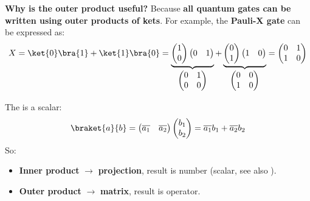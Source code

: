 \highspace
\textcolor{Green3}{ \textbf{Why is the outer product useful?}} Because \textbf{all quantum gates can be written using outer products of kets}. For example, the \textbf{Pauli-X gate} can be expressed as:
\begin{equation*}
    X = \ket{0}\bra{1} + \ket{1}\bra{0} =
    \underbrace{\begin{pmatrix}
        1 \\ 0
    \end{pmatrix}
    \begin{pmatrix}
        0 & 1
    \end{pmatrix}}_{\begin{pmatrix}
        0 & 1 \\
        0 & 0
    \end{pmatrix}}
    +
    \underbrace{\begin{pmatrix}
        0 \\ 1
    \end{pmatrix}
    \begin{pmatrix}
        1 & 0
    \end{pmatrix}}_{\begin{pmatrix}
        0 & 0 \\
        1 & 0
    \end{pmatrix}}
    =
    \begin{pmatrix}
        0 & 1 \\
        1 & 0
    \end{pmatrix}
\end{equation*}

\highspace
The   is a scalar:
\begin{equation}\label{eq:inner-product-2}
    \braket{a}{b} = \begin{pmatrix}
        \overline{a_{1}} & \overline{a_{2}}
    \end{pmatrix}
    \begin{pmatrix}
        b_{1} \\
        b_{2}
    \end{pmatrix}
    =
    \overline{a_{1}} b_{1} + \overline{a_{2}} b_{2}
\end{equation}
So:
\begin{itemize}
    \item \textbf{Inner product} $\rightarrow$ \textbf{projection}, result is number (scalar, see also ).
    \item \textbf{Outer product} $\rightarrow$ \textbf{matrix}, result is operator.
\end{itemize}

